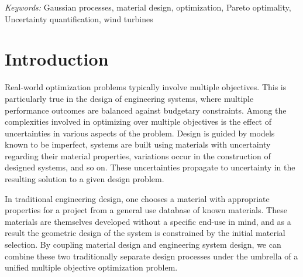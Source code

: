 \documentclass[12pt]{article}
\begin{document}
\noindent%
{\it Keywords:}  Gaussian processes, material design, optimization, Pareto optimality, Uncertainty quantification, wind turbines
\vfill

\newpage
{} %
\section{Introduction}
\label{introduction}

Real-world optimization problems typically involve multiple objectives. 
%
This is particularly true in the design of engineering systems, where multiple performance outcomes are balanced against budgetary constraints. 
%
Among the complexities involved in optimizing over multiple objectives is the effect of uncertainties in various aspects of the problem. 
%
Design is guided by models known to be imperfect, systems are built using materials with uncertainty regarding their material properties, variations occur in the construction of designed systems, and so on. 
%
These uncertainties propagate to uncertainty in the resulting solution to a given design problem. 

In traditional engineering design, one chooses a material with appropriate properties for a project from a general use database of known materials. 
%
These materials are themselves developed without a specific end-use in mind, and as a result the geometric design of the system is constrained by the initial material selection.
%
By coupling material design and engineering system design, we can combine these two traditionally separate design processes under the umbrella of a unified multiple objective optimization problem.
\end{document}
